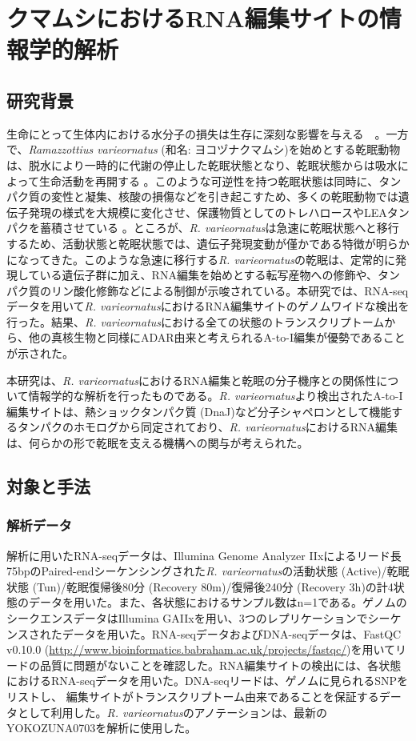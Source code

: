 \chapter{クマムシにおけるRNA編集サイトの情報学的解析}
\section{研究背景}
生命にとって生体内における水分子の損失は生存に深刻な影響を与える　\citep{pmid21547992}。一方で、{\it Ramazzottius varieornatus} (和名: ヨコヅナクマムシ)を始めとする乾眠動物は、脱水により一時的に代謝の停止した乾眠状態となり、乾眠状態からは吸水によって生命活動を再開する \citep{pmid14561331}。このような可逆性を持つ乾眠状態は同時に、タンパク質の変性と凝集、核酸の損傷などを引き起こすため、多くの乾眠動物では遺伝子発現の様式を大規模に変化させ、保護物質としてのトレハロースやLEAタンパクを蓄積させている \citep{pmid19732016, pmid21440551}。ところが、{\it R. varieornatus}は急速に乾眠状態へと移行するため、活動状態と乾眠状態では、遺伝子発現変動が僅かである特徴が明らかになってきた。このような急速に移行する{\it R. varieornatus}の乾眠は、定常的に発現している遺伝子群に加え、RNA編集を始めとする転写産物への修飾や、タンパク質のリン酸化修飾などによる制御が示唆されている。本研究では、RNA-seqデータを用いて{\it R. varieornatus}におけるRNA編集サイトのゲノムワイドな検出を行った。結果、{\it R. varieornatus}における全ての状態のトランスクリプトームから、他の真核生物と同様にADAR由来と考えられるA-to-I編集が優勢であることが示された。
\par
本研究は、{\it R. varieornatus}におけるRNA編集と乾眠の分子機序との関係性について情報学的な解析を行ったものである。{\it R. varieornatus}より検出されたA-to-I編集サイトは、熱ショックタンパク質 (DnaJ)など分子シャペロンとして機能するタンパクのホモログから同定されており、{\it R. varieornatus}におけるRNA編集は、何らかの形で乾眠を支える機構への関与が考えられた。

\section{対象と手法}
\subsection{解析データ}
解析に用いたRNA-seqデータは、Illumina Genome Analyzer IIxによるリード長75bpのPaired-endシーケンシングされた{\it R. varieornatus}の活動状態 (Active)/乾眠状態 (Tun)/乾眠復帰後80分 (Recovery 80m)/復帰後240分 (Recovery 3h)の計4状態のデータを用いた。また、各状態におけるサンプル数はn=1である。ゲノムのシークエンスデータはIllumina GAIIxを用い、3つのレプリケーションでシーケンスされたデータを用いた。RNA-seqデータおよびDNA-seqデータは、FastQC v0.10.0 (\url{http://www.bioinformatics.babraham.ac.uk/projects/fastqc/})を用いてリードの品質に問題がないことを確認した。RNA編集サイトの検出には、各状態におけるRNA-seqデータを用いた。DNA-seqリードは、ゲノムに見られるSNPをリストし、 編集サイトがトランスクリプトーム由来であることを保証するデータとして利用した。{\it R. varieornatus}のアノテーションは、最新のYOKOZUNA0703を解析に使用した。

